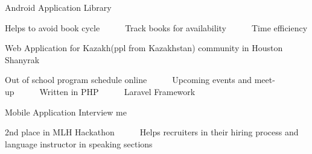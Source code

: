 \vspace{-1.5em}%
\begin{cventries}
  \cventry
    {Android Application}
    {Library}
    {}
    {}
    {
      \begin{cvitems}
        \item {Helps to avoid book cycle~~~\bullet~~~Track books for availability~~~\bullet~~~Time efficiency}
      \end{cvitems} 
    }
\end{cventries}

\begin{cventries}
\vspace{-1.2em}%
  \cventry
    {Web Application for Kazakh(ppl from Kazakhstan) community in Houston}
    {Shanyrak}
    {}
    {}
    {
      \begin{cvitems}
        \item {Out of school program schedule online~~~\bullet~~~Upcoming events and meet-up~~~\bullet~~~Written in PHP~~~\bullet~~~Laravel Framework}
      \end{cvitems} 
    }
\end{cventries}

\begin{cventries}
\vspace{-1.2em}%
  \cventry
    {Mobile Application}
    {Interview me}
    {}
    {}
    {
      \begin{cvitems}
        \item {2nd place in MLH Hackathon~~~\bullet~~~Helps recruiters in their hiring process and language instructor in speaking sections}
      \end{cvitems} 
    }
\end{cventries}